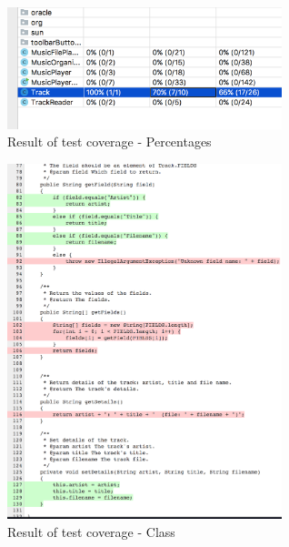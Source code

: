 \begin{figure}[H]
  \centering
  \includegraphics[width=8cm]{body/s2.png}
  \caption{Result of test coverage - Percentages}
\end{figure}

\begin{figure}[H]
  \centering
  \includegraphics[width=8cm]{body/s3.png}
  \caption{Result of test coverage - Class}
\end{figure}
